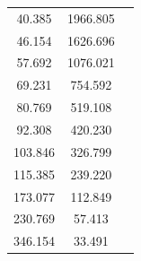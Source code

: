 \documentclass[UTF8]{article}
\theoremstyle{MyLineTheoremStyle} %
\theoremstyle{MyBlockTheoremStyle} %
\theoremstyle{MySubsubsectionStyle} %
\begin{document}
\begin{center}
\begin{minipage}{0.35\columnwidth}
\begin{table}[H]
\begin{tabular}{ccc}
40.385	& 1966.805 \\
46.154	& 1626.696 \\
57.692	& 1076.021 \\
69.231	& 754.592  \\
80.769	& 519.108  \\
92.308	& 420.230  \\
103.846	& 326.799  \\
115.385	& 239.220  \\
173.077	& 112.849  \\
230.769	& 57.413   \\
346.154	& 33.491   \\
\bottomrule
\end{tabular}
\end{table}
\end{minipage}\begin{minipage}{0.25\columnwidth}
\begin{figure}[H]\centering

\end{figure}
\end{minipage}
\end{center}
\end{document}
